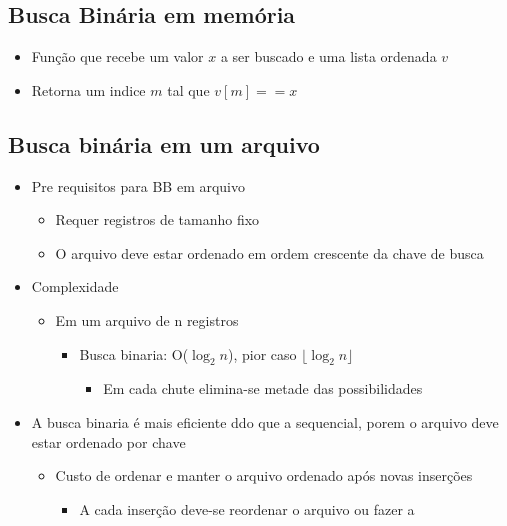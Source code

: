 \documentclass[12pt]{article}
\begin{document}
    \subsection{Busca Binária em memória}
    \begin{itemize}
        \item Função que recebe um valor $x$ a ser buscado e uma lista ordenada 
        $v$
        \item Retorna um indice $m$ tal que $v[m] == x$
    \end{itemize}
    \subsection{Busca binária em um arquivo}
    \begin{itemize}
        \item Pre requisitos para BB em arquivo
        \begin{itemize}
            \item Requer registros de tamanho fixo
            \item O arquivo deve estar ordenado em ordem crescente da chave de 
            busca
        \end{itemize}
        \item Complexidade
        \begin{itemize}
            \item Em um arquivo de n registros
            \begin{itemize}
                \item Busca binaria: O($\log_2n$), pior caso $\lfloor \log_2n 
                \rfloor$
                \begin{itemize}
                    \item Em cada chute elimina-se metade das possibilidades
                \end{itemize}
            \end{itemize}
        \end{itemize}
        \item A busca binaria é mais eficiente ddo que a sequencial, porem o 
        arquivo deve estar ordenado por chave
        \begin{itemize}
            \item Custo de ordenar e manter o arquivo ordenado após novas 
            inserções
            \begin{itemize}
                \item A cada inserção deve-se reordenar o arquivo ou fazer a 

\end{itemize}
\end{itemize}
\end{itemize}
\end{document}
